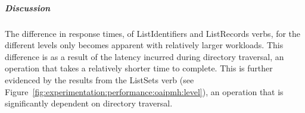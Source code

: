 % 
\begin{comment}
\begin{figure}
 \centering
 \framebox[\textwidth]{%

 }
 \caption[OAI-PMH data provider\index{OAI-PMH!Data Provider} GetRecord\index{OAI-PMH!Verbs!GetRecord} performance]{OAI-PMH data provider\index{OAI-PMH!Data Provider} GetRecord\index{OAI-PMH!Verbs!GetRecord} performance}
 \label{fig:experimentation:performance:oaipmh:getrecord-level}
\end{figure}


\begin{figure}
 \centering
 \framebox[\textwidth]{%

 }
 \caption[OAI-PMH data provider\index{OAI-PMH!Data Provider} ListIdentifiers\index{OAI-PMH!Verbs!ListIdentifiers} performance]{OAI-PMH data provider\index{OAI-PMH!Data Provider} ListIdentifiers\index{OAI-PMH!Verbs!ListIdentifiers} performance}
 \label{fig:experimentation:performance:oaipmh:listidentifiers-level}
\end{figure}


\begin{figure}
 \centering
 \framebox[\textwidth]{%

 }
 \caption[OAI-PMH data provider\index{OAI-PMH!Data Provider} ListRecords\index{OAI-PMH!Verbs!ListRecords} performance]{OAI-PMH data provider\index{OAI-PMH!Data Provider} ListRecords\index{OAI-PMH!Verbs!ListRecords} performance}
 \label{fig:experimentation:performance:oaipmh:listrecords-level}
\end{figure}

\begin{figure}
 \centering
 \framebox[\textwidth]{%

 }
 \caption[OAI-PMH data provider\index{OAI-PMH!Data Provider} ListSets\index{OAI-PMH!Verbs!ListSets} performance]{OAI-PMH data provider\index{OAI-PMH!Data Provider} ListSets\index{OAI-PMH!Verbs!ListSets} performance}
 \label{fig:experimentation:performance:oaipmh:listsets-level}
\end{figure}
\end{comment}

\subparagraph{Discussion}

The difference in response times, of ListIdentifiers and ListRecords verbs, for the different levels only becomes apparent with relatively larger workloads. This difference is as a result of the latency incurred during directory traversal, an operation that takes a relatively shorter time to complete. This is further evidenced by the results from the ListSets verb (see Figure~\ref{fig:experimentation:performance:oaipmh:level}), an operation that is significantly dependent on directory traversal.

